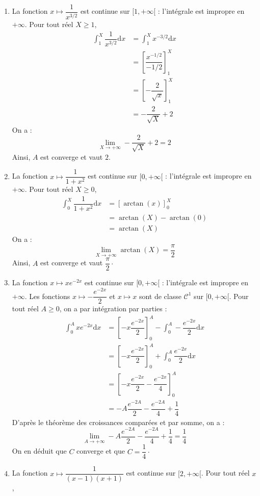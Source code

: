 \documentclass[a4paper,twoside,french,10pt]{VcCours}
\newcommand{\dx}{\text{d}x}
\begin{document}
\begin{enumerate}
\item La fonction $x \mapsto  \dfrac{1}{x^{3/2}}$ est continue sur $[1, + \infty[$ : l'intégrale est impropre en $+ \infty$. Pour tout réel $X \geq 1$,
\begin{align*}
\int_1^X \dfrac{1}{x^{3/2}} \dx & = \int_1^X x^{-3/2} \dx  \\
& = \left[ \dfrac{x^{-1/2}}{-1/2} \right]_1^X \\
& = \left[ -\dfrac{2}{\sqrt{x}} \right]_1^X \\
& = - \dfrac{2}{\sqrt{X}} + 2
\end{align*}
On a :
$$ \lim_{X \rightarrow + \infty}  - \dfrac{2}{\sqrt{X}} + 2 = 2$$
Ainsi, $A$ est converge et vaut $2$.
\item La fonction $x \mapsto  \dfrac{1}{1+x^2}$ est continue sur $[0, + \infty[$ : l'intégrale est impropre en $+ \infty$. Pour tout réel $X \geq 0$,
\begin{align*}
\int_0^X \dfrac{1}{1+x^2} \dx & = \left[ \arctan(x) \right]_0^X \\
& =\arctan(X)- \arctan(0)\\
& = \arctan(X)
\end{align*}
On a :
$$ \lim_{X \rightarrow + \infty} \arctan(X) =  \dfrac{\pi}{2}$$
Ainsi, $A$ est converge et vaut $\dfrac{\pi}{2} \cdot$
\item La fonction $x \mapsto x e^{-2x}$ est continue sur $[0, + \infty[$ : l'intégrale est impropre en $+ \infty$. Les fonctions $x \mapsto -\dfrac{e^{-2x}}{2}$ et $x \mapsto x$ sont de classe $\mathcal{C}^1$ sur $[0, + \infty[$. Pour tout réel $A \geq 0$, on a par intégration par parties :
\begin{align*}
 \int_0^{A} x e^{-2x} \dx & = \left[ -x \dfrac{e^{-2x}}{2} \right]_0^A - \int_0^A -\dfrac{e^{-2x}}{2} \dx \\
 & = \left[ -x \dfrac{e^{-2x}}{2} \right]_0^A + \int_0^A \dfrac{e^{-2x}}{2} \dx \\
 & = \left[ -x \dfrac{e^{-2x}}{2} - \dfrac{e^{-2x}}{4}\right]_0^A \\
 & =  -A \dfrac{e^{-2A}}{2} - \dfrac{e^{-2A}}{4} + \dfrac{1}{4}
 \end{align*}
D'après le théorème des croissances comparées et par somme, on a :
$$ \lim_{A \rightarrow + \infty}  -A \dfrac{e^{-2A}}{2} - \dfrac{e^{-2A}}{4} + \dfrac{1}{4} = \dfrac{1}{4}$$
On en déduit que $C$ converge et que $C= \dfrac{1}{4} \cdot$
\item La fonction $x \mapsto \dfrac{1}{(x-1)(x+1)}$ est continue sur $[2, + \infty[$. Pour tout réel $x$,

\end{enumerate}
\end{document}
